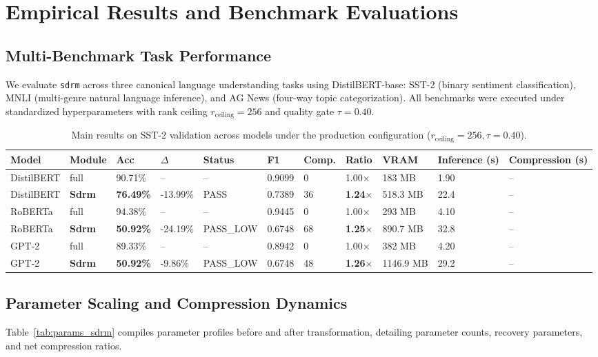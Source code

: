 \section{Empirical Results and Benchmark Evaluations}
\label{sec:results}

\subsection{Multi-Benchmark Task Performance}
We evaluate \texttt{sdrm} across three canonical language understanding tasks using DistilBERT-base: SST-2 (binary sentiment classification), MNLI (multi-genre natural language inference), and AG News (four-way topic categorization). All benchmarks were executed under standardized hyperparameters with rank ceiling $r_{\mathrm{ceiling}} = 256$ and quality gate $\tau = 0.40$.

\begin{table}[t]
\centering
\small
\begin{tabular}{lllllllllll}
\toprule
\textbf{Model} & \textbf{Module} & \textbf{Acc} & \textbf{$\Delta$} & \textbf{Status} & \textbf{F1} & \textbf{Comp.} & \textbf{Ratio} & \textbf{VRAM} & \textbf{Inference (s)} & \textbf{Compression (s)} \\
\midrule
DistilBERT & full & 90.71\% & -- & -- & 0.9099 & 0 & 1.00$\times$ & 183 MB & 1.90 & -- \\
DistilBERT & \textbf{Sdrm} & \textbf{76.49\%} & -13.99\% & PASS & 0.7389 & 36 & \textbf{1.24$\times$} & 518.3 MB & 22.4 & -- \\
RoBERTa & full & 94.38\% & -- & -- & 0.9445 & 0 & 1.00$\times$ & 293 MB & 4.10 & -- \\
RoBERTa & \textbf{Sdrm} & \textbf{50.92\%} & -24.19\% & PASS_LOW & 0.6748 & 68 & \textbf{1.25$\times$} & 890.7 MB & 32.8 & -- \\
GPT-2 & full & 89.33\% & -- & -- & 0.8942 & 0 & 1.00$\times$ & 382 MB & 4.20 & -- \\
GPT-2 & \textbf{Sdrm} & \textbf{50.92\%} & -9.86\% & PASS_LOW & 0.6748 & 48 & \textbf{1.26$\times$} & 1146.9 MB & 29.2 & -- \\
\bottomrule
\end{tabular}
\caption{Main results on SST-2 validation across models under the production configuration ($r_{\mathrm{ceiling}}=256, \tau=0.40$).}
\label{tab:main_sst2}
\end{table}

\subsection{Parameter Scaling and Compression Dynamics}
Table~\ref{tab:params_sdrm} compiles parameter profiles before and after transformation, detailing parameter counts, recovery parameters, and net compression ratios.

